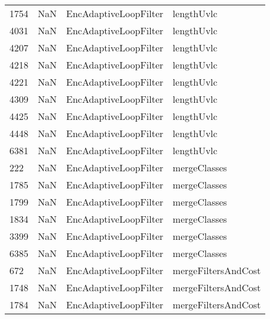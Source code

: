 \begin{tabular}{llll}
1754 &                   NaN &      EncAdaptiveLoopFilter &                                lengthUvlc \\
4031 &                   NaN &      EncAdaptiveLoopFilter &                                lengthUvlc \\
4207 &                   NaN &      EncAdaptiveLoopFilter &                                lengthUvlc \\
4218 &                   NaN &      EncAdaptiveLoopFilter &                                lengthUvlc \\
4221 &                   NaN &      EncAdaptiveLoopFilter &                                lengthUvlc \\
4309 &                   NaN &      EncAdaptiveLoopFilter &                                lengthUvlc \\
4425 &                   NaN &      EncAdaptiveLoopFilter &                                lengthUvlc \\
4448 &                   NaN &      EncAdaptiveLoopFilter &                                lengthUvlc \\
6381 &                   NaN &      EncAdaptiveLoopFilter &                                lengthUvlc \\
222  &                   NaN &      EncAdaptiveLoopFilter &                              mergeClasses \\
1785 &                   NaN &      EncAdaptiveLoopFilter &                              mergeClasses \\
1799 &                   NaN &      EncAdaptiveLoopFilter &                              mergeClasses \\
1834 &                   NaN &      EncAdaptiveLoopFilter &                              mergeClasses \\
3399 &                   NaN &      EncAdaptiveLoopFilter &                              mergeClasses \\
6385 &                   NaN &      EncAdaptiveLoopFilter &                              mergeClasses \\
672  &                   NaN &      EncAdaptiveLoopFilter &                       mergeFiltersAndCost \\
1748 &                   NaN &      EncAdaptiveLoopFilter &                       mergeFiltersAndCost \\
1784 &                   NaN &      EncAdaptiveLoopFilter &                       mergeFiltersAndCost \\

\end{tabular}
